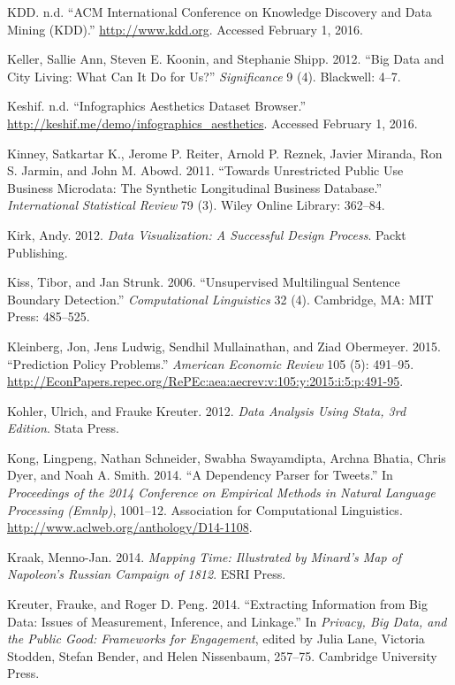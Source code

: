 \documentclass[]{krantz}
\begin{document}
\hypertarget{ref-kdd}{}
KDD. n.d. ``ACM International Conference on Knowledge Discovery and Data
Mining (KDD).'' \url{http://www.kdd.org}. Accessed February 1, 2016.

\hypertarget{ref-keller2012big}{}
Keller, Sallie Ann, Steven E. Koonin, and Stephanie Shipp. 2012. ``Big
Data and City Living: What Can It Do for Us?'' \emph{Significance} 9
(4). Blackwell: 4--7.

\hypertarget{ref-harrisonweb}{}
Keshif. n.d. ``Infographics Aesthetics Dataset Browser.''
\url{http://keshif.me/demo/infographics_aesthetics}. Accessed February
1, 2016.

\hypertarget{ref-kinney2011towards}{}
Kinney, Satkartar K., Jerome P. Reiter, Arnold P. Reznek, Javier
Miranda, Ron S. Jarmin, and John M. Abowd. 2011. ``Towards Unrestricted
Public Use Business Microdata: The Synthetic Longitudinal Business
Database.'' \emph{International Statistical Review} 79 (3). Wiley Online
Library: 362--84.

\hypertarget{ref-kirk2012data}{}
Kirk, Andy. 2012. \emph{Data Visualization: A Successful Design
Process}. Packt Publishing.

\hypertarget{ref-kiss-06}{}
Kiss, Tibor, and Jan Strunk. 2006. ``Unsupervised Multilingual Sentence
Boundary Detection.'' \emph{Computational Linguistics} 32 (4).
Cambridge, MA: MIT Press: 485--525.

\hypertarget{ref-Kleinberg2015}{}
Kleinberg, Jon, Jens Ludwig, Sendhil Mullainathan, and Ziad Obermeyer.
2015. ``Prediction Policy Problems.'' \emph{American Economic Review}
105 (5): 491--95.
\url{http://EconPapers.repec.org/RePEc:aea:aecrev:v:105:y:2015:i:5:p:491-95}.

\hypertarget{ref-kohler2012datenanalyse}{}
Kohler, Ulrich, and Frauke Kreuter. 2012. \emph{Data Analysis Using
Stata, 3rd Edition}. Stata Press.

\hypertarget{ref-kong-14}{}
Kong, Lingpeng, Nathan Schneider, Swabha Swayamdipta, Archna Bhatia,
Chris Dyer, and Noah A. Smith. 2014. ``A Dependency Parser for Tweets.''
In \emph{Proceedings of the 2014 Conference on Empirical Methods in
Natural Language Processing (Emnlp)}, 1001--12. Association for
Computational Linguistics.
\url{http://www.aclweb.org/anthology/D14-1108}.

\hypertarget{ref-Kraak2014}{}
Kraak, Menno-Jan. 2014. \emph{Mapping Time: Illustrated by Minard's Map
of Napoleon's Russian Campaign of 1812}. ESRI Press.

\hypertarget{ref-kreuter201412}{}
Kreuter, Frauke, and Roger D. Peng. 2014. ``Extracting Information from
Big Data: Issues of Measurement, Inference, and Linkage.'' In
\emph{Privacy, Big Data, and the Public Good: Frameworks for
Engagement}, edited by Julia Lane, Victoria Stodden, Stefan Bender, and
Helen Nissenbaum, 257--75. Cambridge University Press.
\end{document}
